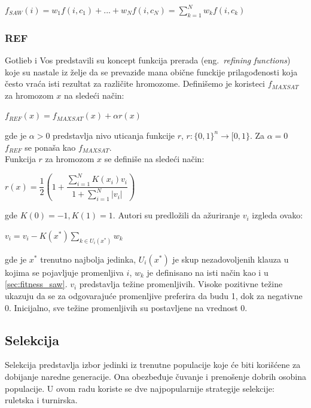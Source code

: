 \documentclass[a4paper]{article}
\begin{document}
	\begin{center}
	$ f_{SAW}(i) = w_1 f(i, c_1) + ... + w_N f(i, c_N) = \sum_{k=1}^{N} w_k f(i, c_k)	$
	\end{center}


\subsubsection{REF}
\label{sec:fitness_rfea}
Gotlieb i Vos \cite{GotVos98_f_ref} predstavili su koncept funkcija prerada 
(eng.~{\em refining functions}) koje su nastale iz želje da se prevaziđe mana obične 
funckije prilagođenosti koja često vraća isti rezultat za različite hromozome. 
Definišemo je koristeci $f_{MAXSAT}$ za hromozom $x$ na sledeći način:

\begin{center}
	$ f_{REF} (x) = f_{MAXSAT} (x) + \alpha r(x) $
\end{center}
gde je $\alpha > 0 $ predstavlja nivo uticanja funkcije $r$, 
$ r : \lbrace 0, 1 \rbrace ^ n \rightarrow [0, 1 \rbrace $. 
Za $\alpha = 0 $ $f_{REF} $ se ponaša kao $f_{MAXSAT} $. \\

Funkcija $r$ za hromozom $x$ se definiše na sledeći način:

\begin{center}
$r(x) = \dfrac{1}{2} ( 1 + \dfrac{\sum_{i=1}^{N} K(x_i) v_i} {1+ \sum_{i=1}^{N} |v_i|})$
\end{center}
gde  $ K(0) = -1, K(1) = 1 $. Autori su predložili da ažuriranje $v_i$  izgleda ovako:
 
\begin{center}
	$ v_i = v_i - K(x^*) \sum_{k \in U_i(x^*)} w_k $
\end{center}
gde je $x^*$ trenutno najbolja jedinka, $U_i (x^*)$ je skup nezadovoljenih klauza 
u kojima se pojavljuje promenljiva $i$, $w_k$ je definisano na isti način kao i u
\ref{sec:fitness_saw}. $v_i$ predstavlja težine promenljivih. Visoke pozitivne težine 
ukazuju da se za odgovarajuće promenljive preferira da budu 1, dok za negativne 0. 
Inicijalno, sve težine promenljivih su postavljene na vrednost 0.


\subsection{Selekcija}
\label{sec:ea_selekcija}
Selekcija predstavlja izbor jedinki iz trenutne populacije koje će biti korišćene za dobijanje
naredne generacije. Ona obezbeđuje čuvanje i prenošenje dobrih osobina populacije. 
U ovom radu koriste se dve najpopularnije strategije selekcije: ruletska i turnirska.
\end{document}
